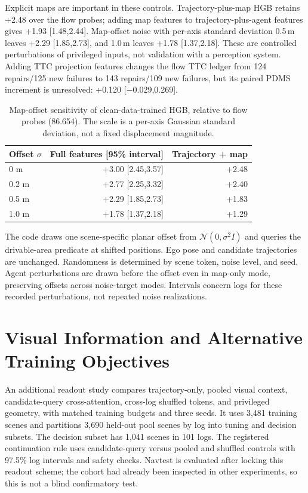 \documentclass[10pt,letterpaper]{article}
\begin{document}
Explicit maps are important in these controls. Trajectory-plus-map HGB retains +2.48 over the flow probes; adding map features to trajectory-plus-agent features gives +1.93 [1.48,2.44]. Map-offset noise with per-axis standard deviation 0.5\,m leaves +2.29 [1.85,2.73], and 1.0\,m leaves +1.78 [1.37,2.18]. These are controlled perturbations of privileged inputs, not validation with a perception system. Adding TTC projection features changes the flow TTC ledger from 124 repairs/125 new failures to 143 repairs/109 new failures, but its paired PDMS increment is unresolved: +0.120 [$-0.029$,0.269].


\begin{table}[H]
\centering\caption{Map-offset sensitivity of clean-data-trained HGB, relative to flow probes (86.654). The scale is a per-axis Gaussian standard deviation, not a fixed displacement magnitude.}
\begin{tabular}{lrr}\toprule
Offset $\sigma$ & Full features [95\% interval] & Trajectory + map\\\midrule
0 m & +3.00 [2.45,3.57] & +2.48\\
0.2 m & +2.77 [2.25,3.32] & +2.40\\
0.5 m & +2.29 [1.85,2.73] & +1.83\\
1.0 m & +1.78 [1.37,2.18] & +1.29\\\bottomrule
\end{tabular}
\end{table}

The code draws one scene-specific planar offset from $\mathcal N(0,\sigma^2 I)$ and queries the drivable-area predicate at shifted positions. Ego pose and candidate trajectories are unchanged. Randomness is determined by scene token, noise level, and seed. Agent perturbations are drawn before the offset even in map-only mode, preserving offsets across noise-target modes. Intervals concern logs for these recorded perturbations, not repeated noise realizations.

\FloatBarrier
\section{Visual Information and Alternative Training Objectives}
An additional readout study compares trajectory-only, pooled visual context, candidate-query cross-attention, cross-log shuffled tokens, and privileged geometry, with matched training budgets and three seeds. It uses 3,481 training scenes and partitions 3,690 held-out pool scenes by log into tuning and decision subsets. The decision subset has 1,041 scenes in 101 logs. The registered continuation rule uses candidate-query versus pooled and shuffled controls with 97.5\% log intervals and safety checks. Navtest is evaluated after locking this readout scheme; the cohort had already been inspected in other experiments, so this is not a blind confirmatory test.
\end{document}
